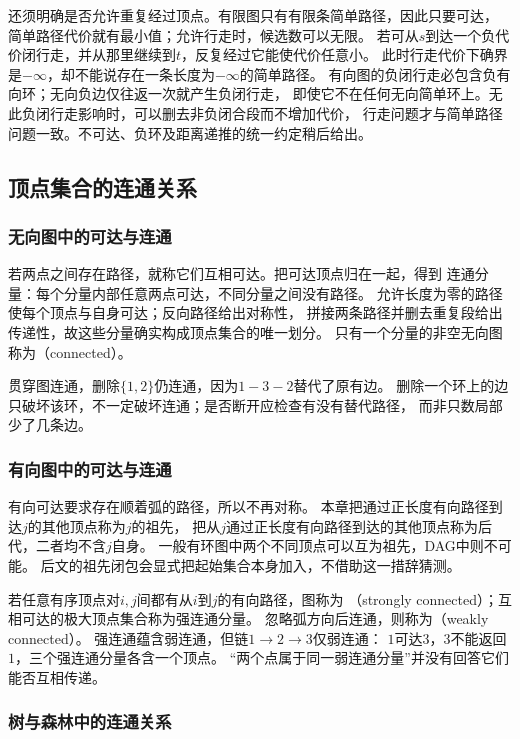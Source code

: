 还须明确是否允许重复经过顶点。有限图只有有限条简单路径，因此只要可达，
简单路径代价就有最小值；允许行走时，候选数可以无限。
若可从\(s\)到达一个负代价闭行走，并从那里继续到\(t\)，反复经过它能使代价任意小。
此时行走代价下确界是\(-\infty\)，却不能说存在一条长度为\(-\infty\)的简单路径。
有向图的负闭行走必包含负有向环；无向负边仅往返一次就产生负闭行走，
即使它不在任何无向简单环上。无此负闭行走影响时，可以删去非负闭合段而不增加代价，
行走问题才与简单路径问题一致。不可达、负环及距离递推的统一约定稍后给出。

\subsection{顶点集合的连通关系}

\subsubsection{无向图中的可达与连通}

若两点之间存在路径，就称它们互相可达。把可达顶点归在一起，得到
连通分量：每个分量内部任意两点可达，不同分量之间没有路径。
允许长度为零的路径使每个顶点与自身可达；反向路径给出对称性，
拼接两条路径并删去重复段给出传递性，故这些分量确实构成顶点集合的唯一划分。
只有一个分量的非空无向图称为（connected）。

贯穿图连通，删除\(\{1,2\}\)仍连通，因为\(1-3-2\)替代了原有边。
删除一个环上的边只破坏该环，不一定破坏连通；是否断开应检查有没有替代路径，
而非只数局部少了几条边。

\subsubsection{有向图中的可达与连通}

有向可达要求存在顺着弧的路径，所以不再对称。
本章把通过正长度有向路径到达\(j\)的其他顶点称为\(j\)的祖先，
把从\(j\)通过正长度有向路径到达的其他顶点称为后代，二者均不含\(j\)自身。
一般有环图中两个不同顶点可以互为祖先，DAG中则不可能。
后文的祖先闭包会显式把起始集合本身加入，不借助这一措辞猜测。

若任意有序顶点对\(i,j\)间都有从\(i\)到\(j\)的有向路径，图称为
（strongly connected）；互相可达的极大顶点集合称为强连通分量。
忽略弧方向后连通，则称为（weakly connected）。
强连通蕴含弱连通，但链\(1\to2\to3\)仅弱连通：
\(1\)可达\(3\)，\(3\)不能返回\(1\)，三个强连通分量各含一个顶点。
“两个点属于同一弱连通分量”并没有回答它们能否互相传递。

\subsubsection{树与森林中的连通关系}

